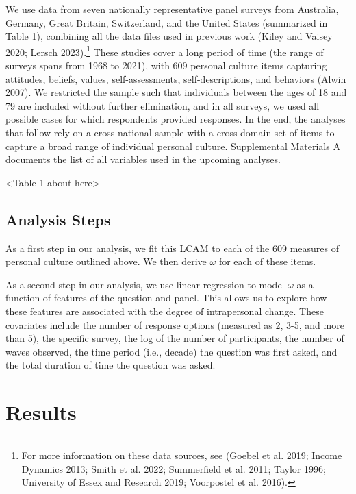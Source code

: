 \documentclass[
  12pt,
]{article}
\begin{document}
We use data from seven nationally representative panel surveys from
Australia, Germany, Great Britain, Switzerland, and the United States
(summarized in Table 1), combining all the data files used in previous
work (Kiley and Vaisey 2020; Lersch 2023).\footnote{For more information
  on these data sources, see (Goebel et al. 2019; Income Dynamics 2013;
  Smith et al. 2022; Summerfield et al. 2011; Taylor 1996; University of
  Essex and Research 2019; Voorpostel et al. 2016).} These studies cover
a long period of time (the range of surveys spans from 1968 to 2021),
with 609 personal culture items capturing attitudes, beliefs, values,
self-assessments, self-descriptions, and behaviors (Alwin 2007). We
restricted the sample such that individuals between the ages of 18 and
79 are included without further elimination, and in all surveys, we used
all possible cases for which respondents provided responses. In the end,
the analyses that follow rely on a cross-national sample with a
cross-domain set of items to capture a broad range of individual
personal culture. Supplemental Materials A documents the list of all
variables used in the upcoming analyses.

\begin{center}
<Table 1 about here>
\end{center}

\hypertarget{analysis-steps}{%
\subsection{Analysis Steps}\label{analysis-steps}}

As a first step in our analysis, we fit this LCAM to each of the 609
measures of personal culture outlined above. We then derive \(\omega\)
for each of these items.

As a second step in our analysis, we use linear regression to model
\(\omega\) as a function of features of the question and panel. This
allows us to explore how these features are associated with the degree
of intrapersonal change. These covariates include the number of response
options (measured as 2, 3-5, and more than 5), the specific survey, the
log of the number of participants, the number of waves observed, the
time period (i.e., decade) the question was first asked, and the total
duration of time the question was asked.

\hypertarget{results}{%
\section{Results}\label{results}}
\end{document}
